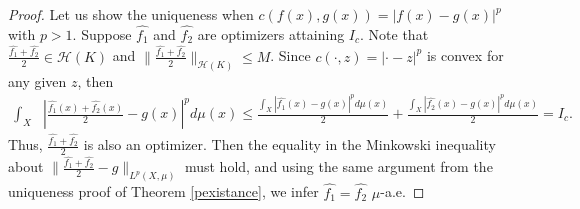 \documentclass{amsart}
\numberwithin{equation}{section}
\theoremstyle{plain}
\theoremstyle{remark}
\theoremstyle{definition}
\begin{document}
\begin{proof}
Let us show the uniqueness when $c(f(x),g(x)) = |f(x)-g(x)|^p$ with $p>1$. 
Suppose $\hat{f_1}$ and $\hat{f_2}$ are optimizers attaining $I_c$. 
Note that $\frac{\hat{f_1}+\hat{f_2}}{2} \in \mathscr{H}(K)$ and $\|\frac{\hat{f_1}+\hat{f_2}}{2}\|_{\mathscr{H}(K)} \leq M$.
Since $c(\cdot,z) = |\cdot - z|^p$ is convex for any given $z$, then
\begin{equation*}
\begin{split}
     \int_{X}&  |\frac{\hat{f_1}(x)+\hat{f_2}(x)}{2}- g(x)|^p d\mu(x)
     \leq \frac{\int_{X} |\hat{f_1}(x)- g(x)|^p d\mu(x)}{2} +  \frac{\int_{X}  |\hat{f_2}(x)- g(x)|^p d\mu(x)}{2} =I_c. 
\end{split}
\end{equation*}
 Thus, $\frac{\hat{f_1}+\hat{f_2}}{2}$ is also an optimizer. Then the equality in the Minkowski inequality about $\| \frac{\hat{f_1}+\hat{f_2}}{2}-g \|_{L^p(X,\mu)}$ must hold, and using the same argument from the uniqueness proof of Theorem \ref{pexistance}, we infer $\hat{f_1}=\hat{f_2}$ $\mu$-a.e.
\qedhere
\end{proof}
\end{document}
